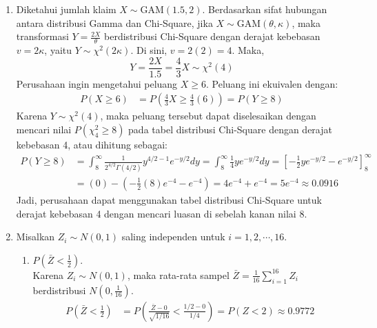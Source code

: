 \documentclass[11pt,letterpaper]{article}
\begin{document}
\begin{enumerate}
  \item
        Diketahui jumlah klaim $X \sim \text{GAM}(1.5, 2)$.
        Berdasarkan sifat hubungan antara distribusi Gamma dan Chi-Square, jika $X \sim \text{GAM}(\theta, \kappa)$, maka transformasi $Y = \frac{2X}{\theta}$ berdistribusi Chi-Square dengan derajat kebebasan $v = 2\kappa$, yaitu $Y \sim \chi^2(2\kappa)$. Di sini, $v = 2(2) = 4$.
        Maka,
        \[ Y = \frac{2X}{1.5} = \frac{4}{3}X \sim \chi^2(4) \]
        Perusahaan ingin mengetahui peluang $X \ge 6$. Peluang ini ekuivalen dengan:
        \begin{align*}
          P(X \ge 6) & = P\left(\frac{4}{3}X \ge \frac{4}{3}(6)\right) = P(Y \ge 8)
        \end{align*}
        Karena $Y \sim \chi^2(4)$, maka peluang tersebut dapat diselesaikan dengan mencari nilai $P(\chi^2_4 \ge 8)$ pada tabel distribusi Chi-Square dengan derajat kebebasan 4, atau dihitung sebagai:
        \begin{align*}
          P(Y \ge 8) & = \int_8^\infty \frac{1}{2^{4/2}\Gamma(4/2)} y^{4/2 - 1} e^{-y/2} dy = \int_8^\infty \frac{1}{4} y e^{-y/2} dy           = \left[ -\frac{1}{2}ye^{-y/2} - e^{-y/2} \right]_8^\infty \\
                     & = (0) - \left(-\frac{1}{2}(8)e^{-4} - e^{-4}\right)  = 4e^{-4} + e^{-4} = 5e^{-4} \approx 0.0916
        \end{align*}
        Jadi, perusahaan dapat menggunakan tabel distribusi Chi-Square untuk derajat kebebasan 4 dengan mencari luasan di sebelah kanan nilai 8.

  \item
        Misalkan $Z_i \sim N(0, 1)$ saling independen untuk $i = 1, 2, \cdots, 16$.
        \begin{enumerate}[label=(\alph*)]
          \item $P\left(\bar{Z} < \frac{1}{2}\right)$. \\
                Karena $Z_i \sim N(0, 1)$, maka rata-rata sampel $\bar{Z} = \frac{1}{16} \sum_{i=1}^{16} Z_i$ berdistribusi $N\left(0, \frac{1}{16}\right)$.
                \begin{align*}
                  P\left(\bar{Z} < \frac{1}{2}\right) & = P\left( \frac{\bar{Z} - 0}{\sqrt{1/16}} < \frac{1/2 - 0}{1/4} \right) = P(Z < 2)                                                           \approx 0.9772
                \end{align*}


\end{enumerate}
\end{enumerate}
\end{document}
